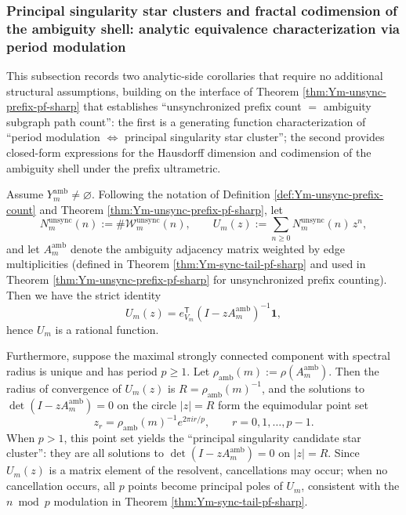 
\subsubsection{Principal singularity star clusters and fractal codimension of the ambiguity shell: analytic equivalence characterization via period modulation}\label{subsubsec:Ym-amb-singularity-star-codimension}
This subsection records two analytic-side corollaries that require no additional structural assumptions, building on the interface of Theorem \ref{thm:Ym-unsync-prefix-pf-sharp} that establishes ``unsynchronized prefix count \(=\) ambiguity subgraph path count'':
the first is a generating function characterization of ``period modulation \(\Longleftrightarrow\) principal singularity star cluster'';
the second provides closed-form expressions for the Hausdorff dimension and codimension of the ambiguity shell under the prefix ultrametric.

\begin{theorem}\label{thm:Ym-amb-main-singularity-star}
Assume \(Y_m^{\mathrm{amb}}\neq\varnothing\).
Following the notation of Definition \ref{def:Ym-unsync-prefix-count} and Theorem \ref{thm:Ym-unsync-prefix-pf-sharp}, let
\[
N_m^{\mathrm{unsync}}(n):=\#\mathcal{W}_{m}^{\mathrm{unsync}}(n),
\qquad
U_m(z):=\sum_{n\ge 0}N_m^{\mathrm{unsync}}(n)\,z^n,
\]
and let \(A_m^{\mathrm{amb}}\) denote the ambiguity adjacency matrix weighted by edge multiplicities (defined in Theorem \ref{thm:Ym-sync-tail-pf-sharp} and used in Theorem \ref{thm:Ym-unsync-prefix-pf-sharp} for unsynchronized prefix counting).
Then we have the strict identity
\[
U_m(z)=e_{V_m}^{\mathsf T}(I-zA_m^{\mathrm{amb}})^{-1}\mathbf 1,
\]
hence \(U_m\) is a rational function.
\par
Furthermore, suppose the maximal strongly connected component with spectral radius is unique and has period \(p\ge 1\).
Let \(\rho_{\mathrm{amb}}(m):=\rho(A_m^{\mathrm{amb}})\). Then the radius of convergence of \(U_m(z)\) is \(R=\rho_{\mathrm{amb}}(m)^{-1}\), and the solutions to \(\det(I-zA_m^{\mathrm{amb}})=0\) on the circle \(|z|=R\) form the equimodular point set
\[
z_r=\rho_{\mathrm{amb}}(m)^{-1}e^{2\pi i r/p},\qquad r=0,1,\dots,p-1.
\]
When \(p>1\), this point set yields the ``principal singularity candidate star cluster'': they are all solutions to \(\det(I-zA_m^{\mathrm{amb}})=0\) on \(|z|=R\).
Since \(U_m(z)\) is a matrix element of the resolvent, cancellations may occur; when no cancellation occurs, all \(p\) points become principal poles of \(U_m\), consistent with the \(n\bmod p\) modulation in Theorem \ref{thm:Ym-sync-tail-pf-sharp}.
\end{theorem}

